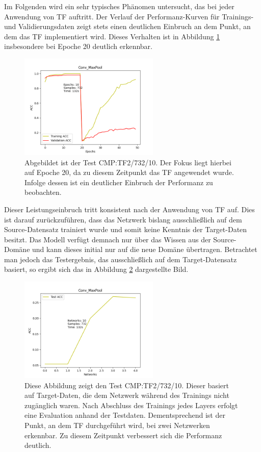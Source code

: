 Im Folgenden wird ein sehr typisches Phänomen untersucht, das bei jeder Anwendung von TF auftritt. Der Verlauf der 
Performanz-Kurven für Trainings- und Validierungsdaten zeigt stets einen deutlichen Einbruch an dem Punkt, an dem das TF 
implementiert wird. Dieses Verhalten ist in Abbildung \ref{fig:convmaxpooltrain} insbesondere bei Epoche 20 deutlich erkennbar.

\begin{figure}[htpb]
    \centering
    \includegraphics[height=5cm]{../../Plots/ba_plots/convmaxpool/convmaxpooltrain.png}
    \caption{\label{fig:convmaxpooltrain} 
    \small{Abgebildet ist der Test CMP:TF2/732/10. Der Fokus liegt hierbei auf Epoche 20, da zu diesem Zeitpunkt das TF 
    angewendet wurde. Infolge dessen ist ein deutlicher Einbruch der Performanz zu beobachten.}}
\end{figure}

Dieser Leistungseinbruch tritt konsistent nach der Anwendung von TF auf. Dies ist darauf zurückzuführen, dass das Netzwerk 
bislang ausschließlich auf dem Source-Datensatz trainiert wurde und somit keine Kenntnis der Target-Daten besitzt. Das Modell verfügt demnach 
nur über das Wissen aus der Source-Domäne und kann dieses initial nur auf die neue Domäne übertragen. Betrachtet man jedoch das Testergebnis, 
das ausschließlich auf dem Target-Datensatz basiert, so ergibt sich das in Abbildung \ref{fig:convmaxpooltest} dargestellte Bild.

\begin{figure}[htpb]
    \centering
    \includegraphics[height=5cm]{../../Plots/ba_plots/convmaxpool/convmaxpooltest.png}
    \caption{\label{fig:convmaxpooltest} 
    \small{Diese Abbildung zeigt den Test CMP:TF2/732/10. Dieser basiert auf Target-Daten, die dem Netzwerk während des 
    Trainings nicht zugänglich waren. Nach Abschluss des Trainings jedes Layers erfolgt eine Evaluation anhand der Testdaten. Dementsprechend 
    ist der Punkt, an dem TF durchgeführt wird, bei zwei Netzwerken erkennbar. Zu diesem Zeitpunkt verbessert sich die 
    Performanz deutlich.}}
\end{figure}

